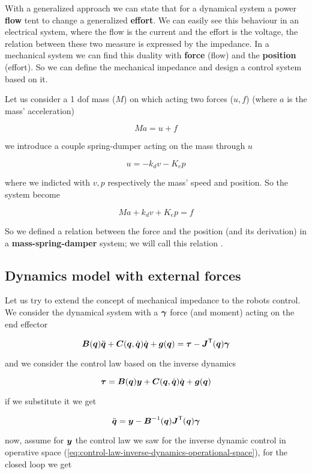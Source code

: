 With a generalized approach we can state that for a dynamical system a power \textbf{flow} tent to change a generalized \textbf{effort}.
We can easily see this behaviour in an electrical system, where the flow is the current and the effort is the voltage, the relation between these two measure is expressed by the impedance.
In a mechanical system we can find this duality with \textbf{force} (flow) and the \textbf{position} (effort).
So we can define the mechanical impedance and design a control system based on it.


Let us consider a 1 dof mass ($M$) on which acting two forces ($u, f$) (where $a$ is the mass' acceleration)

\[
	M a = u + f
\]

we introduce a couple spring-dumper acting on the mass through $u$

\[
	u = - k_d v - K_e p
\]

where we indicted with $v, p$ respectively the mass' speed and position.
So the system become

\[
	M a + k_d v + K_e p = f
\]

So we defined a relation between the force and the position (and its derivation) in a \textbf{mass-spring-damper} system;
we will call this relation .

\subsection{Dynamics model with external forces}

Let us try to extend the concept of mechanical impedance to the robots control.
We consider the dynamical system with a $\boldsymbol{\gamma}$ force (and moment) acting on the end effector

\[
	\boldsymbol{B}(\boldsymbol{q})\ddot{\boldsymbol{q}} + \boldsymbol{C}(\boldsymbol{q},\dot{\boldsymbol{q}})\dot{\boldsymbol{q}} + \boldsymbol{g}(\boldsymbol{q}) = \boldsymbol{\tau} - \boldsymbol{J}^{\mathsf{T}}(\boldsymbol{q})\boldsymbol{\gamma}
\]

and we consider the control law based on the inverse dynamics

\[
	\boldsymbol{\tau} = \boldsymbol{B}(\boldsymbol{q})\boldsymbol{y} + \boldsymbol{C}(\boldsymbol{q},\dot{\boldsymbol{q}})\dot{\boldsymbol{q}} + \boldsymbol{g}(\boldsymbol{q})
\]

if we substitute it we get

\[
	\ddot{\boldsymbol{q}} = \boldsymbol{y} - \boldsymbol{B}^{-1}(\boldsymbol{q})\boldsymbol{J}^{\mathsf{T}}(\boldsymbol{q})\boldsymbol{\gamma}
\]

now, assume for $\boldsymbol{y}$ the control law we saw for the inverse dynamic control in operative space (\autoref{eq:control-law-inverse-dynamics-operational-space}), for the closed loop we get

